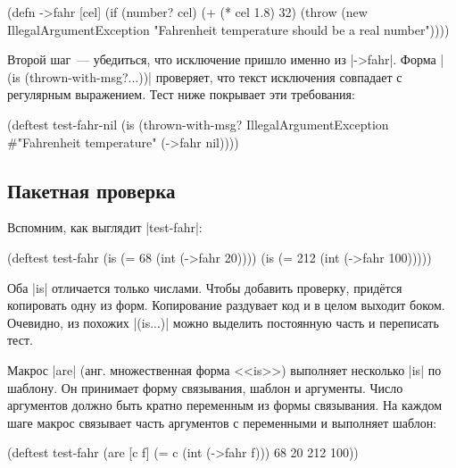 \begin{english}
  \begin{clojure}
(defn ->fahr [cel]
  (if (number? cel)
    (+ (* cel 1.8) 32)
    (throw (new IllegalArgumentException
            "Fahrenheit temperature should be a real number"))))
  \end{clojure}
\end{english}

Второй шаг~--- убедиться, что исключение пришло именно из \spverb|->fahr|. Форма
\spverb|(is (thrown-with-msg?...))| проверяет, что текст исключения совпадает с
регулярным выражением. Тест ниже покрывает эти требования:

\begin{english}
  \begin{clojure}
(deftest test-fahr-nil
  (is (thrown-with-msg?
       IllegalArgumentException #"Fahrenheit temperature"
       (->fahr nil))))
  \end{clojure}
\end{english}

\subsection{Пакетная проверка}

Вспомним, как выглядит \spverb|test-fahr|:

\begin{english}
  \begin{clojure}
(deftest test-fahr
  (is (= 68 (int (->fahr 20))))
  (is (= 212 (int (->fahr 100)))))
  \end{clojure}
\end{english}

Оба \spverb|is| отличается только числами. Чтобы добавить проверку, придётся
копировать одну из форм. Копирование раздувает код и в целом выходит
боком. Очевидно, из похожих \spverb|(is...)| можно выделить постоянную часть и
переписать тест.


Макрос \spverb|are| (анг. множественная форма <<is>>) выполняет несколько
\spverb|is| по шаблону. Он принимает форму связывания, шаблон и аргументы. Число
аргументов должно быть кратно переменным из формы связывания. На каждом шаге
макрос связывает часть аргументов с переменными и выполняет шаблон:

\begin{english}
  \begin{clojure}
(deftest test-fahr
  (are [c f] (= c (int (->fahr f)))
    68 20
    212 100))
  \end{clojure}
\end{english}

